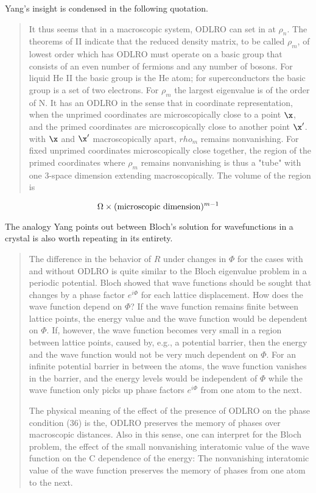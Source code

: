 Yang's insight is condensed in the following quotation.
%
\begin{quote}
It thus seems that in a macroscopic system, ODLRO can set in 
at $\rho_{n}$. The theorems of II indicate that
the reduced density matrix, to be called $\rho_{m}$, of lowest
order which has ODLRO must operate on a basic group that consists 
of an even number of fermions and any number of bosons. For liquid He II the basic
group is the He atom; for superconductors the basic group is a set of two electrons.
For $\rho_{m}$ the largest eigenvalue is of the order of N. It has an ODLRO
in the sense that in coordinate representation, when the unprimed coordinates are
microscopically close to a point $\x$, and the primed coordinates are microscopically
close to another point $\x'$. with $\x$ and $\x'$ macroscopically apart, $rho_{m}$
remains nonvanishing. For fixed unprimed coordinates microscopically
close together, the region of the primed coordinates where
$\rho_{m}$ remains nonvanishing is thus a "tube" with one 3-space dimension 
extending macroscopically. The volume of the region is 
\end{quote}
\begin{equation}
\Omega \times ({\rm microscopic\ dimension})^{m-1}
\end{equation}
%

The analogy Yang points out between Bloch's solution for wavefunctions 
in a crystal is also worth repeating in its entirety.

\begin{quote}
  The difference in the behavior of $R$ under changes in $\Phi$ for the cases 
with and without ODLRO is quite similar to the Bloch eigenvalue problem
in a periodic potential. Bloch showed that wave functions should be sought 
that changes by a phase factor $e^{i\Phi}$ for each lattice displacement. How does the 
wave function depend on $\Phi$? If the wave function remains finite between lattice points, 
the energy value and the wave function would be dependent on $\Phi$. If, however, 
the wave function becomes very small in a region between lattice points, 
caused by, e.g., a potential barrier, then the energy and the wave function 
would not be very much dependent on $\Phi$. For an infinite potential barrier in 
between the atoms, the wave function vanishes in the barrier, and the energy 
levels would be independent of $\Phi$ while the
wave function only picks up phase factors $e^{i\Phi}$ from one atom to the next.

  The physical meaning of the effect of the presence of ODLRO on the 
phase condition (36) is the, ODLRO preserves the memory of phases over 
macroscopic distances. Also in this sense, one can interpret for the 
Bloch problem, the effect of the small nonvanishing interatomic 
value of the wave function on the C dependence of the energy: 
The nonvanishing interatomic value of the wave function preserves the 
memory of phases from one atom to the next.
\end{quote}

